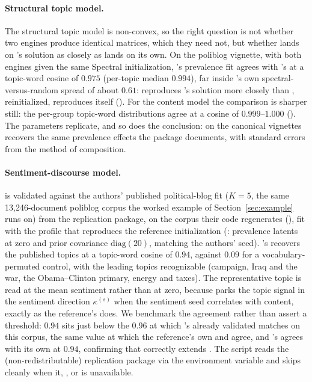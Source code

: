 \documentclass[article]{jss}
\begin{document}
\paragraph{Structural topic model.} The structural topic model is non-convex, so
the right question is not whether two engines produce identical matrices, which
they need not, but whether  lands on 's solution as closely
as  lands on its own. On the poliblog vignette, with both engines given
the same Spectral initialization, 's prevalence fit agrees with
 's at a topic-word cosine of $0.975$ (per-topic median
$0.994$), far inside 's own spectral-versus-random spread of about
$0.61$:  reproduces 's solution more closely than
, reinitialized, reproduces itself ().
For the content model the comparison is sharper still: the per-group topic-word
distributions agree at a cosine of $0.999$--$1.000$ ().
The parameters replicate, and so does the conclusion: on the canonical vignettes
 recovers the same prevalence effects the package documents, with
standard errors from the method of composition.

\paragraph{Sentiment-discourse model.}  is validated against the
authors' published political-blog fit ($K=5$, the same 13{,}246-document poliblog
corpus the worked example of Section~\ref{sec:example} runs on) from the
\citet{chen2024sts} replication package, on the corpus their  code
regenerates (), fit with the profile that
reproduces the reference initialization (: prevalence
latents at zero and prior covariance $\mathrm{diag}(20)$, matching the authors'
 seed). 's  recovers
the published topics at a topic-word cosine of $0.94$, against $0.09$ for a
vocabulary-permuted control, with the leading topics recognizable
(campaign, Iraq and the war, the Obama--Clinton primary, energy and taxes). The
representative topic is read at the mean sentiment rather than at zero, because
 parks the topic signal in the sentiment direction $\kappa^{(s)}$ when
the sentiment seed correlates with content, exactly as the reference's
 does. We benchmark the agreement rather than assert a
threshold: $0.94$ sits just below the $0.96$ at which 's already
validated  matches   on this corpus, the same value
at which the reference's own  and  agree, and 's
 agrees with its own  at $0.94$, confirming that 
correctly extends . The script reads the (non-redistributable)
replication package via the  environment variable and skips
cleanly when it, , or  is unavailable.
\end{document}
